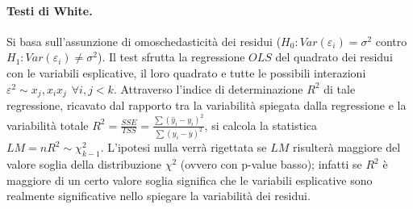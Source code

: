 \documentclass[a4page, 11pt]{article} %
\begin{document}
\paragraph{Testi di White. } Si basa sull’assunzione di omoschedasticità dei residui ($H_0: Var(\varepsilon_i) = \sigma^2$ contro $H_1: Var(\varepsilon_i) \neq \sigma^2$). %
Il test sfrutta la regressione $OLS$ del quadrato dei residui con le variabili esplicative, il loro quadrato e tutte le possibili interazioni $\varepsilon^2 \sim x_j, x_ix_j \hspace{5pt} \forall i, j < k$. %
Attraverso l'indice di determinazione $R^2$ di tale regressione, ricavato dal rapporto tra la variabilità spiegata dalla regressione e la variabilità totale $R^2 = \frac{SSE}{TSS} = \frac{\sum(\hat{y}_i - y_i)^2}{\sum(y_i - \overline{y})^2}$, si calcola la statistica $LM = n R^2 \sim \chi^2_{k-1}$.
L’ipotesi nulla verrà rigettata se $LM$ risulterà maggiore del valore soglia della distribuzione $\chi^2$ (ovvero con p-value basso); %
infatti se $R^2$ è maggiore di un certo valore soglia significa che le variabili esplicative sono realmente significative nello spiegare la variabilità dei residui.
\end{document}
